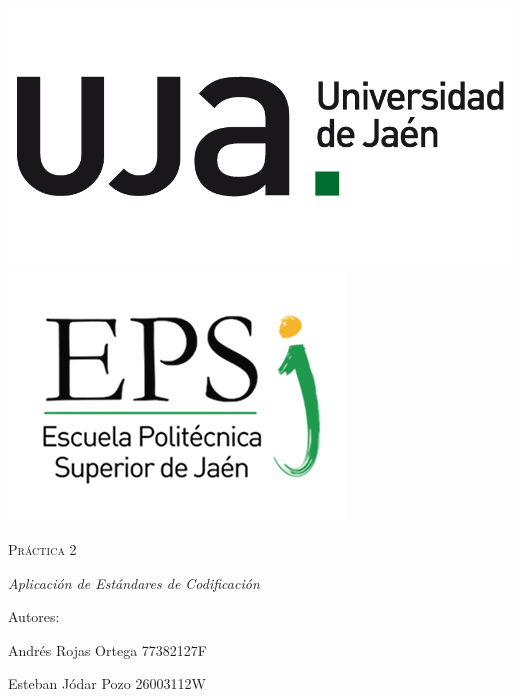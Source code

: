 	\begin{titlepage}
		\centering
		{\includegraphics[scale=0.2]{img/np_UJA_generica_6.png}
		\includegraphics[scale=0.35]{img/Logo_EPS.png}}
		\vspace{1cm}
		{\scshape\Huge Práctica 2 \par}
		\vspace{3cm}
		{\itshape\Large Aplicación de Estándares de Codificación \par}
		\vfill
		{\Large Autores: \par}
		{\Large Andrés Rojas Ortega 77382127F\par}
		{\Large Esteban Jódar Pozo 26003112W\par}
		\vfill
	\end{titlepage}

	\paragraph{}
	\paragraph{}
	
	\tableofcontents
	
	\newpage

